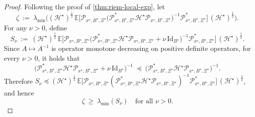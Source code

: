 \documentclass[final,onefignum,onetabnum]{siamart250211}
\begin{document}
\begin{proof}
    Following the proof of \cref{thm:riem-local-exp}, let
    \begin{equation}
    \label{eq:zeta-definition}
    \zeta\ :=\ \lambda_{\min}\!\Big((\mathcal{H}^\star)^{\frac{1}{2}}\,\mathbb E\big[\mathcal{P}_{x^\star, B^\star, \Xi^\star}\big(\mathcal{P}_{x^\star, B^\star, \Xi^\star}^{*}\mathcal{H}^\star \mathcal{P}_{x^\star, B^\star, \Xi^\star}\big)^{-1}\mathcal{P}_{x^\star, B^\star, \Xi^\star}^{*}\big]\,(\mathcal{H}^\star)^{\frac{1}{2}}\Big).
    \end{equation}
    For any $\nu>0$, define
    \[
    S_{\nu}\ :=\ (\mathcal{H}^\star)^{\frac{1}{2}}\,\mathbb E\Big[\mathcal{P}_{x^\star, B^\star, \Xi^\star}\big(\mathcal{P}_{x^\star, B^\star, \Xi^\star}^{*}\mathcal{H}^\star \mathcal{P}_{x^\star, B^\star, \Xi^\star}+\nu \,\mathrm{Id}_{B^\star}\big)^{-1}\mathcal{P}_{x^\star, B^\star, \Xi^\star}^{*}\Big]\,(\mathcal{H}^\star)^{\frac{1}{2}}.
    \]
    Since $A\mapsto A^{-1}$ is operator monotone decreasing on positive definite operators, for every $\nu>0$, it holds that
    \[
    \big(\mathcal{P}_{x^\star, B^\star, \Xi^\star}^{*}\mathcal{H}^\star \mathcal{P}_{x^\star, B^\star, \Xi^\star}+\nu\,\mathrm{Id}_{B^\star}\big)^{-1}
    \ \preceq\ 
    \big(\mathcal{P}_{x^\star, B^\star, \Xi^\star}^{*}\mathcal{H}^\star \mathcal{P}_{x^\star, B^\star, \Xi^\star}\big)^{-1}.
    \]
    Therefore $S_{\nu}\preceq (\mathcal{H}^\star)^{\frac{1}{2}}\,\mathbb E\big[\mathcal{P}_{x^\star, B^\star, \Xi^\star}(\mathcal{P}_{x^\star, B^\star, \Xi^\star}^{*}\mathcal{H}^\star \mathcal{P}_{x^\star, B^\star, \Xi^\star})^{-1}\mathcal{P}_{x^\star, B^\star, \Xi^\star}^{*}\big]\,(\mathcal{H}^\star)^{\frac{1}{2}}$, and hence
    \begin{equation}
    \label{eq:zeta-lower-by-Smu}
    \zeta\ \ge\ \lambda_{\min}(S_{\nu})\quad \text{for all } \nu>0.
    \end{equation}
    

\end{proof}
\end{document}
